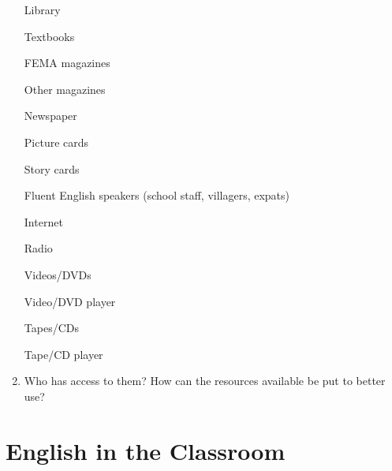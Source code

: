 \begin{enumerate}
\textbigcircle{} Library


\textbigcircle{} Textbooks


\textbigcircle{} FEMA magazines


\textbigcircle{} Other magazines


\textbigcircle{} Newspaper


\textbigcircle{} Picture cards


\textbigcircle{} Story cards


\textbigcircle{} Fluent English speakers (school staff, villagers,
expats)


\textbigcircle{} Internet


\textbigcircle{} Radio


\textbigcircle{} Videos/DVDs


\textbigcircle{} Video/DVD player


\textbigcircle{} Tapes/CDs


\textbigcircle{} Tape/CD player

\item Who has access to them? How can the resources available be put to
better use? \\[60pt]
\end{enumerate}

\section{English in the Classroom}


